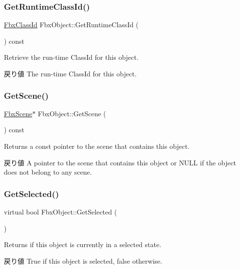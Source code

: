 \subsubsection{\texorpdfstring{Get\+Runtime\+Class\+Id()}{GetRuntimeClassId()}}
{\footnotesize\ttfamily \hyperlink{class_fbx_class_id}{Fbx\+Class\+Id} Fbx\+Object\+::\+Get\+Runtime\+Class\+Id (\begin{DoxyParamCaption}{ }\end{DoxyParamCaption}) const}

Retrieve the run-\/time Class\+Id for this object. \begin{DoxyReturn}{戻り値}
The run-\/time Class\+Id for this object. 
\end{DoxyReturn}
\mbox{\label{class_fbx_object_a2e76cc1e34a8474a4dddd7dee28e04c2}} 
\subsubsection{\texorpdfstring{Get\+Scene()}{GetScene()}}
{\footnotesize\ttfamily \hyperlink{class_fbx_scene}{Fbx\+Scene}$\ast$ Fbx\+Object\+::\+Get\+Scene (\begin{DoxyParamCaption}{ }\end{DoxyParamCaption}) const}

Returns a const pointer to the scene that contains this object. \begin{DoxyReturn}{戻り値}
A pointer to the scene that contains this object or {\ttfamily N\+U\+LL} if the object does not belong to any scene. 
\end{DoxyReturn}
\mbox{\label{class_fbx_object_ade0dddb02e39f6823d0bea6071ef4410}} 
\subsubsection{\texorpdfstring{Get\+Selected()}{GetSelected()}}
{\footnotesize\ttfamily virtual bool Fbx\+Object\+::\+Get\+Selected (\begin{DoxyParamCaption}{ }\end{DoxyParamCaption})\hspace{0.3cm}{\ttfamily [virtual]}}

Returns if this object is currently in a selected state. \begin{DoxyReturn}{戻り値}
{\ttfamily True} if this object is selected, {\ttfamily false} otherwise. 
\end{DoxyReturn}
\mbox{\label{class_fbx_object_a655ed30675d9bf1686ec075f5e7c7a84}} 
